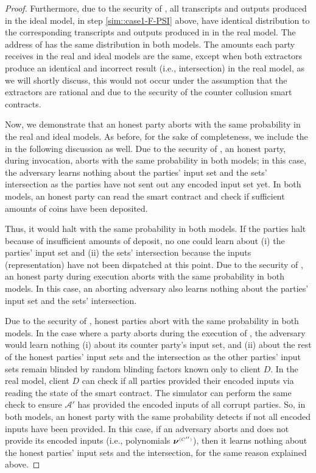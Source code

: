 \begin{proof}
Furthermore, due to the security of \fpsi, all transcripts and outputs produced in the ideal model, in step \ref{sim::case1-F-PSI} above, have identical distribution to the corresponding transcripts and outputs produced in \fpsi in the real model.  
%
The address of \SCtc has the same distribution in both models. The amounts each party receives in the real and ideal models are the same, except when both extractors produce an identical and incorrect result (i.e., intersection) in the real model, as we will shortly discuss, this would not occur under the assumption that the extractors are rational and due to the security of the counter collusion smart contracts.

  

  

Now, we demonstrate that an honest party aborts with the same probability in the real and ideal models. As before, for the sake of completeness, we include the \fpsi in the following discussion as well.  Due to the security of \ct, an honest party, during \ct invocation, aborts with the same probability in both models; in this case, the adversary learns nothing about the parties' input set and the sets' intersection as the parties have not sent out any encoded input set yet. In both models, an honest party can read the smart contract and check if sufficient amounts of coins have been deposited. 

Thus, it would halt with the same probability in both models.  If the parties halt because of insufficient amounts of deposit, no one could learn about (i) the parties' input set and (ii) the sets' intersection because the inputs (representation) have not been dispatched at this point.  Due to the security of \zspaa, an honest party during \zspaa execution aborts with the same probability in both models.  In this case, an aborting adversary also learns nothing about the parties' input set and the sets' intersection. %




Due to the security of \vopr, honest parties abort with the same probability in both models. In the case where a party aborts during the execution of \vopr, the adversary would learn nothing (i) about its counter party's input set, and (ii) about the rest of the honest parties' input sets and the intersection as the other parties' input sets remain blinded by random blinding factors known only to client $D$. In the real model, client $D$ can check if all parties provided their encoded inputs via reading the state of the smart contract.  The simulator can perform the same check to ensure  $\mathcal{A}'$ has provided the encoded inputs of all corrupt parties. So, in both models, an honest party with the same probability detects if not all encoded inputs have been provided. In this case, if an adversary aborts and does not provide its encoded inputs (i.e., polynomials ${\bm\nu}^{ \scriptscriptstyle {  {(C'')}} }$), then it learns nothing about the honest parties' input sets and the intersection, for the same reason explained above. 




\end{proof}
